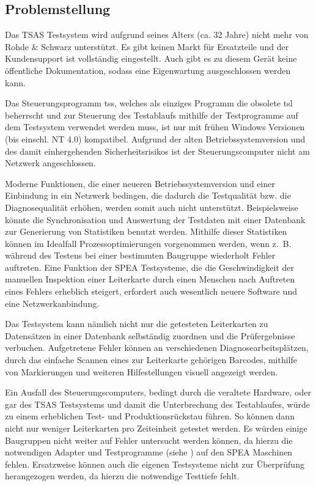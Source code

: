 \subsection{Problemstellung}
    Das TSAS Testsystem wird aufgrund seines Alters (ca. 32 Jahre) nicht mehr von Rohde \& Schwarz unterstützt.
    Es gibt keinen Markt für Ersatzteile und der Kundensupport ist vollständig eingestellt.
    Auch gibt es zu diesem Gerät keine öffentliche Dokumentation, sodass eine Eigenwartung ausgeschlossen werden kann.

    Das Steuerungsprogramm \ac{tss}, welches als einziges Programm die obsolete \ac{tsl} beherrscht und zur Steuerung des Testablaufs mithilfe der Testprogramme auf dem Testsystem verwendet werden muss, ist nur mit frühen Windows Versionen (bis einschl. NT 4.0) kompatibel.
    Aufgrund der alten Betriebssystemversion und des damit einhergehenden Sicherheitsrisikos ist der Steuerungscomputer nicht am Netzwerk angeschlossen.

    Moderne Funktionen, die einer neueren Betriebssystemversion und einer Einbindung in ein Netzwerk bedingen, die dadurch die Testqualität bzw. die Diagnosequalität erhöhen, werden somit auch nicht unterstützt.
    Beispielsweise könnte die Synchronisation und Auswertung der Testdaten mit einer Datenbank zur Generierung von Statistiken benutzt werden.
    Mithilfe dieser Statistiken können im Idealfall Prozessoptimierungen vorgenommen werden, wenn z.~B. während des Testens bei einer bestimmten Baugruppe wiederholt Fehler auftreten.
    Eine Funktion der SPEA Testsysteme, die die Geschwindigkeit der manuellen Inspektion einer Leiterkarte durch einen Menschen nach Auftreten eines Fehlers erheblich steigert, erfordert auch wesentlich neuere Software und eine Netzwerkanbindung.
    
    Das Testsystem kann nämlich nicht nur die getesteten Leiterkarten zu Datensätzen in einer Datenbank selbständig zuordnen und die Prüfergebnisse verbuchen.
    Aufgetretene Fehler können an verschiedenen Diagnosearbeitsplätzen, durch das einfache Scannen eines zur Leiterkarte gehörigen Barcodes, mithilfe von Markierungen und weiteren Hilfestellungen visuell angezeigt werden.

    Ein Ausfall des Steuerungscomputers, bedingt durch die veraltete Hardware, oder gar des TSAS Testsystems und damit die Unterbrechung des Testablaufes, würde zu einem erheblichen Test- und Produktionsrückstau führen.
    So können dann nicht nur weniger Leiterkarten pro Zeiteinheit getestet werden.
    Es würden einige Baugruppen nicht weiter auf Fehler untersucht werden können, da hierzu die notwendigen Adapter und Testprogramme (siehe ) auf den SPEA Maschinen fehlen.
    Ersatzweise können auch die eigenen Testsysteme nicht zur Überprüfung herangezogen werden, da hierzu die notwendige Testtiefe fehlt.

